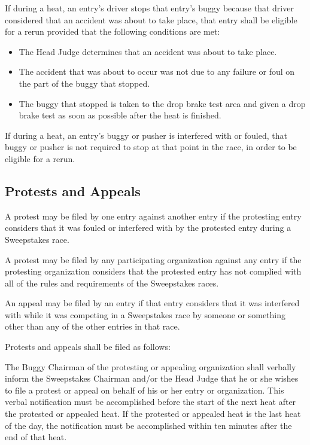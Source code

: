 If during a heat, an entry's driver stops that entry's buggy because that driver considered that an accident was about to take place, that entry shall be eligible for a rerun provided that the following conditions are met:
	\begin{itemize}
		\item The Head Judge determines that an accident was about to take place.
		\item The accident that was about to occur was not due to any failure or foul on the part of the buggy that stopped.
		\item The buggy that stopped is taken to the drop brake test area and given a drop brake test as soon as possible after the heat is finished.
	\end{itemize}

If during a heat, an entry's buggy or pusher is interfered with or fouled, that buggy or pusher is not required to stop at that point in the race, in order to be eligible for a rerun.

\subsection{Protests and Appeals}

A protest may be filed by one entry against another entry if the protesting entry considers that it was fouled or interfered with by the protested entry during a Sweepstakes race.

A protest may be filed by any participating organization against any entry if the protesting organization considers that the protested entry has not complied with all of the rules and requirements of the Sweepstakes races.

An appeal may be filed by an entry if that entry considers that it was interfered with while it was competing in a Sweepstakes race by someone or something other than any of the other entries in that race.

Protests and appeals shall be filed as follows:

The Buggy Chairman of the protesting or appealing organization shall verbally inform the Sweepstakes Chairman and/or the Head Judge that he or she wishes to file a protest or appeal on behalf of his or her entry or organization. This verbal notification must be accomplished before the start of the next heat after the protested or appealed heat. If the protested or appealed heat is the last heat of the day, the notification must be accomplished within ten minutes after the end of that heat.

